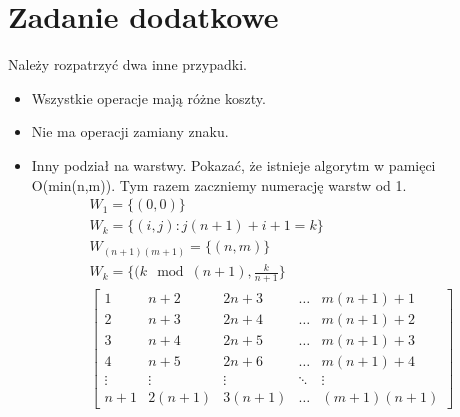 \documentclass[paper=a4, fontsize=11pt]{article}
\begin{document}
\section{Zadanie dodatkowe}
Należy rozpatrzyć dwa inne przypadki.
\begin{itemize}
\item Wszystkie operacje mają różne koszty.
\item Nie ma operacji zamiany znaku.
\item Inny podział na warstwy. Pokazać, że istnieje algorytm w pamięci O(min(n,m)).
Tym razem zaczniemy numerację warstw od 1.
\begin{gather*}
W_1 = \{(0,0) \} \\
W_k = \{(i,j) : j(n+1) + i + 1 = k\} \\
W_{(n+1)(m+1)} = \{(n, m) \} \\
W_k = \{(k\mod{(n +1)},\frac{k}{n+1}\} \\
\begin{bmatrix}
1 & n + 2 & 2n + 3 & \dots & m(n + 1) + 1 \\
2 & n + 3 & 2n + 4 & \dots & m(n + 1) + 2 \\
3 & n + 4 & 2n + 5 & \dots & m(n + 1) + 3 \\
4 & n + 5 & 2n + 6 & \dots & m(n + 1) + 4\\
\vdots & \vdots & \vdots & \ddots & \vdots \\
n+1 & 2(n+1) & 3(n+1) & \dots & (m+1)(n+1) 
\end{bmatrix}
\end{gather*}
\end{itemize}
\end{document}
